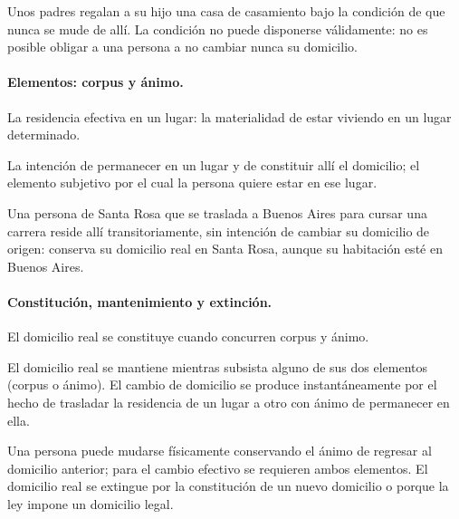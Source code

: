 \documentclass[12pt,oneside]{book}
\begin{document}
\begin{ejemplo}
Unos padres regalan a su hijo una casa de casamiento bajo la condición de que nunca se mude de allí. La condición no puede disponerse válidamente: no es posible obligar a una persona a no cambiar nunca su domicilio.
\end{ejemplo}

\paragraph{Elementos: corpus y ánimo.}

\begin{definicion}[Corpus]
La residencia efectiva en un lugar: la materialidad de estar viviendo en un lugar determinado.
\end{definicion}

\begin{definicion}[Ánimo]
La intención de permanecer en un lugar y de constituir allí el domicilio; el elemento subjetivo por el cual la persona quiere estar en ese lugar.
\end{definicion}

\begin{ejemplo}
Una persona de Santa Rosa que se traslada a Buenos Aires para cursar una carrera reside allí transitoriamente, sin intención de cambiar su domicilio de origen: conserva su domicilio real en Santa Rosa, aunque su habitación esté en Buenos Aires.
\end{ejemplo}

\paragraph{Constitución, mantenimiento y extinción.} El domicilio real se constituye cuando concurren corpus y ánimo.

\begin{regla}
El domicilio real se mantiene mientras subsista alguno de sus dos elementos (corpus o ánimo). El cambio de domicilio se produce instantáneamente por el hecho de trasladar la residencia de un lugar a otro con ánimo de permanecer en ella.
\end{regla}

Una persona puede mudarse físicamente conservando el ánimo de regresar al domicilio anterior; para el cambio efectivo se requieren ambos elementos. El domicilio real se extingue por la constitución de un nuevo domicilio o porque la ley impone un domicilio legal.
\end{document}
